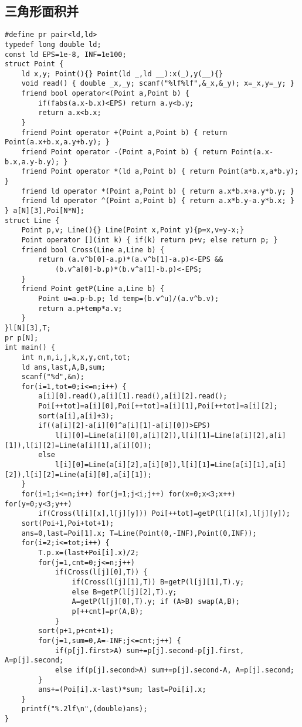 \documentclass{article}
\begin{document}
\subsection{三角形面积并}
\begin{lstlisting}
#define pr pair<ld,ld>
typedef long double ld;
const ld EPS=1e-8, INF=1e100;
struct Point {
	ld x,y; Point(){} Point(ld _,ld __):x(_),y(__){}
	void read() { double _x,_y; scanf("%lf%lf",&_x,&_y); x=_x,y=_y; }
	friend bool operator<(Point a,Point b) {
		if(fabs(a.x-b.x)<EPS) return a.y<b.y;
        return a.x<b.x;
    }
	friend Point operator +(Point a,Point b) { return Point(a.x+b.x,a.y+b.y); }
	friend Point operator -(Point a,Point b) { return Point(a.x-b.x,a.y-b.y); }
	friend Point operator *(ld a,Point b) { return Point(a*b.x,a*b.y); }
	friend ld operator *(Point a,Point b) { return a.x*b.x+a.y*b.y; }
	friend ld operator ^(Point a,Point b) { return a.x*b.y-a.y*b.x; }
} a[N][3],Poi[N*N];
struct Line {
    Point p,v; Line(){} Line(Point x,Point y){p=x,v=y-x;}
	Point operator [](int k) { if(k) return p+v; else return p; }
	friend bool Cross(Line a,Line b) {
		return (a.v^b[0]-a.p)*(a.v^b[1]-a.p)<-EPS &&
			(b.v^a[0]-b.p)*(b.v^a[1]-b.p)<-EPS;
	}
	friend Point getP(Line a,Line b) {
		Point u=a.p-b.p; ld temp=(b.v^u)/(a.v^b.v);
		return a.p+temp*a.v;
	}
}l[N][3],T;
pr p[N];
int main() {
	int n,m,i,j,k,x,y,cnt,tot;
	ld ans,last,A,B,sum;
	scanf("%d",&n);
	for(i=1,tot=0;i<=n;i++) {
		a[i][0].read(),a[i][1].read(),a[i][2].read();
		Poi[++tot]=a[i][0],Poi[++tot]=a[i][1],Poi[++tot]=a[i][2];
		sort(a[i],a[i]+3);
		if((a[i][2]-a[i][0]^a[i][1]-a[i][0])>EPS)
			l[i][0]=Line(a[i][0],a[i][2]),l[i][1]=Line(a[i][2],a[i][1]),l[i][2]=Line(a[i][1],a[i][0]);
		else
			l[i][0]=Line(a[i][2],a[i][0]),l[i][1]=Line(a[i][1],a[i][2]),l[i][2]=Line(a[i][0],a[i][1]);
    }
	for(i=1;i<=n;i++) for(j=1;j<i;j++) for(x=0;x<3;x++) for(y=0;y<3;y++)
		if(Cross(l[i][x],l[j][y])) Poi[++tot]=getP(l[i][x],l[j][y]);
	sort(Poi+1,Poi+tot+1);
	ans=0,last=Poi[1].x; T=Line(Point(0,-INF),Point(0,INF));
	for(i=2;i<=tot;i++) {
        T.p.x=(last+Poi[i].x)/2;
        for(j=1,cnt=0;j<=n;j++)
            if(Cross(l[j][0],T)) {
                if(Cross(l[j][1],T)) B=getP(l[j][1],T).y;
                else B=getP(l[j][2],T).y;
                A=getP(l[j][0],T).y; if (A>B) swap(A,B);
                p[++cnt]=pr(A,B);
            }
        sort(p+1,p+cnt+1);
        for(j=1,sum=0,A=-INF;j<=cnt;j++) {
            if(p[j].first>A) sum+=p[j].second-p[j].first, A=p[j].second;
            else if(p[j].second>A) sum+=p[j].second-A, A=p[j].second;
        }
		ans+=(Poi[i].x-last)*sum; last=Poi[i].x;
	}
	printf("%.2lf\n",(double)ans);
}
\end{lstlisting}
\end{document}
